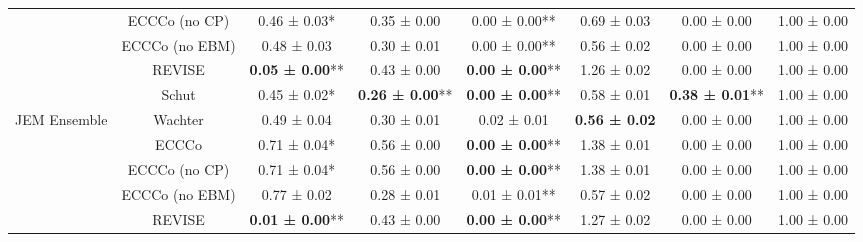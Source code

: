 \begin{table}
{\begin{tabular}[t]{cccccccc}
 & ECCCo (no CP) & 0.46 ± 0.03*\hphantom{*} & 0.35 ± 0.00\hphantom{*}\hphantom{*} & 0.00 ± 0.00** & 0.69 ± 0.03\hphantom{*}\hphantom{*} & 0.00 ± 0.00\hphantom{*}\hphantom{*} & 1.00 ± 0.00\hphantom{*}\hphantom{*}\\

 & ECCCo (no EBM) & 0.48 ± 0.03\hphantom{*}\hphantom{*} & 0.30 ± 0.01\hphantom{*}\hphantom{*} & 0.00 ± 0.00** & 0.56 ± 0.02\hphantom{*}\hphantom{*} & 0.00 ± 0.00\hphantom{*}\hphantom{*} & 1.00 ± 0.00\hphantom{*}\hphantom{*}\\

 & REVISE & \textbf{0.05 ± 0.00}** & 0.43 ± 0.00\hphantom{*}\hphantom{*} & \textbf{0.00 ± 0.00}** & 1.26 ± 0.02\hphantom{*}\hphantom{*} & 0.00 ± 0.00\hphantom{*}\hphantom{*} & 1.00 ± 0.00\hphantom{*}\hphantom{*}\\

 & Schut & 0.45 ± 0.02*\hphantom{*} & \textbf{0.26 ± 0.00}** & \textbf{0.00 ± 0.00}** & 0.58 ± 0.01\hphantom{*}\hphantom{*} & \textbf{0.38 ± 0.01}** & 1.00 ± 0.00\hphantom{*}\hphantom{*}\\

\multirow[t]{-6}{*}{\centering\arraybackslash JEM Ensemble} & Wachter & 0.49 ± 0.04\hphantom{*}\hphantom{*} & 0.30 ± 0.01\hphantom{*}\hphantom{*} & 0.02 ± 0.01\hphantom{*}\hphantom{*} & \textbf{0.56 ± 0.02}\hphantom{*}\hphantom{*} & 0.00 ± 0.00\hphantom{*}\hphantom{*} & 1.00 ± 0.00\hphantom{*}\hphantom{*}\\
\cmidrule{1-8}
 & ECCCo & 0.71 ± 0.04*\hphantom{*} & 0.56 ± 0.00\hphantom{*}\hphantom{*} & \textbf{0.00 ± 0.00}** & 1.38 ± 0.01\hphantom{*}\hphantom{*} & 0.00 ± 0.00\hphantom{*}\hphantom{*} & 1.00 ± 0.00\hphantom{*}\hphantom{*}\\

 & ECCCo (no CP) & 0.71 ± 0.04*\hphantom{*} & 0.56 ± 0.00\hphantom{*}\hphantom{*} & \textbf{0.00 ± 0.00}** & 1.38 ± 0.01\hphantom{*}\hphantom{*} & 0.00 ± 0.00\hphantom{*}\hphantom{*} & 1.00 ± 0.00\hphantom{*}\hphantom{*}\\

 & ECCCo (no EBM) & 0.77 ± 0.02\hphantom{*}\hphantom{*} & 0.28 ± 0.01\hphantom{*}\hphantom{*} & 0.01 ± 0.01** & 0.57 ± 0.02\hphantom{*}\hphantom{*} & 0.00 ± 0.00\hphantom{*}\hphantom{*} & 1.00 ± 0.00\hphantom{*}\hphantom{*}\\

 & REVISE & \textbf{0.01 ± 0.00}** & 0.43 ± 0.00\hphantom{*}\hphantom{*} & \textbf{0.00 ± 0.00}** & 1.27 ± 0.02\hphantom{*}\hphantom{*} & 0.00 ± 0.00\hphantom{*}\hphantom{*} & 1.00 ± 0.00\hphantom{*}\hphantom{*}\\


\end{tabular}}
\end{table}
